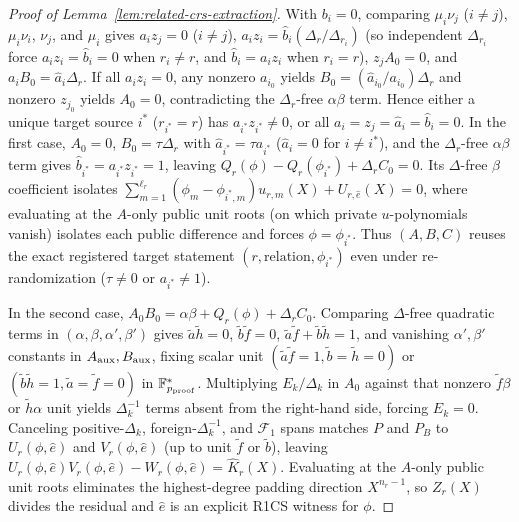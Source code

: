 \documentclass[conference,compsoc]{IEEEtran}
\theoremstyle{definition}
\numberwithin{equation}{section}
\numberwithin{table}{section}
\numberwithin{figure}{section}
\theoremstyle{plain}
\begin{document}
\begin{proof}[Proof of Lemma~\ref{lem:related-crs-extraction}]
With \(b_i=0\), comparing \(\mu_i\nu_j\) (\(i\neq j\)), \(\mu_i\nu_i\), \(\nu_j\), and \(\mu_i\) gives \(a_i z_j = 0\) (\(i\neq j\)), \(a_i z_i = \hat b_i (\Delta_r/\Delta_{r_i})\) (so independent \(\Delta_{r_i}\) force \(a_i z_i = \hat b_i = 0\) when \(r_i \neq r\), and \(\hat b_i = a_i z_i\) when \(r_i = r\)), \(z_j A_0 = 0\), and \(a_i B_0 = \hat a_i \Delta_r\). If all \(a_i z_i = 0\), any nonzero \(a_{i_0}\) yields \(B_0 = (\hat a_{i_0}/a_{i_0})\Delta_r\) and nonzero \(z_{j_0}\) yields \(A_0 = 0\), contradicting the \(\Delta_r\)-free \(\alpha\beta\) term. Hence either a unique target source \(i^*\) (\(r_{i^*}=r\)) has \(a_{i^*}z_{i^*}\neq 0\), or all \(a_i = z_j = \hat a_i = \hat b_i = 0\). In the first case, \(A_0 = 0\), \(B_0 = \tau\Delta_r\) with \(\hat a_{i^*} = \tau a_{i^*}\) (\(\hat a_i = 0\) for \(i\neq i^*\)), and the \(\Delta_r\)-free \(\alpha\beta\) term gives \(\hat b_{i^*} = a_{i^*}z_{i^*} = 1\), leaving \(Q_r(\phi) - Q_r(\phi_{i^*}) + \Delta_r C_0 = 0\). Its \(\Delta\)-free \(\beta\) coefficient isolates \(\sum_{m=1}^{\ell_r}(\phi_m - \phi_{i^*,m})u_{r,m}(X) + U_{r,\hat e}(X) = 0\), where evaluating at the \(A\)-only public unit roots (on which private \(u\)-polynomials vanish) isolates each public difference and forces \(\phi = \phi_{i^*}\). Thus \((A,B,C)\) reuses the exact registered target statement \((r,\text{relation},\phi_{i^*})\) even under re-randomization (\(\tau\neq 0\) or \(a_{i^*}\neq 1\)).

In the second case, \(A_0 B_0 = \alpha\beta + Q_r(\phi) + \Delta_r C_0\). Comparing \(\Delta\)-free quadratic terms in \((\alpha,\beta,\alpha',\beta')\) gives \(\tilde a \tilde h = 0\), \(\tilde b \tilde f = 0\), \(\tilde a \tilde f + \tilde b \tilde h = 1\), and vanishing \(\alpha',\beta'\) constants in \(A_{\rm aux},B_{\rm aux}\), fixing scalar unit \((\tilde a \tilde f = 1, \tilde b=\tilde h=0)\) or \((\tilde b \tilde h = 1, \tilde a=\tilde f=0)\) in \(\mathbb F_{p_{\rm proof}}^*\). Multiplying \(E_k/\Delta_k\) in \(A_0\) against that nonzero \(\tilde f\beta\) or \(\tilde h\alpha\) unit yields \(\Delta_k^{-1}\) terms absent from the right-hand side, forcing \(E_k = 0\). Canceling positive-\(\Delta_k\), foreign-\(\Delta_k^{-1}\), and \(\mathcal F_1\) spans matches \(P\) and \(P_B\) to \(U_r(\phi,\hat e)\) and \(V_r(\phi,\hat e)\) (up to unit \(\tilde f\) or \(\tilde b\)), leaving \(U_r(\phi,\hat e)V_r(\phi,\hat e) - W_r(\phi,\hat e) = \hat K_r(X)\). Evaluating at the \(A\)-only public unit roots eliminates the highest-degree padding direction \(X^{n_r-1}\), so \(Z_r(X)\) divides the residual and \(\hat e\) is an explicit R1CS witness for \(\phi\).
\end{proof}
\end{document}
